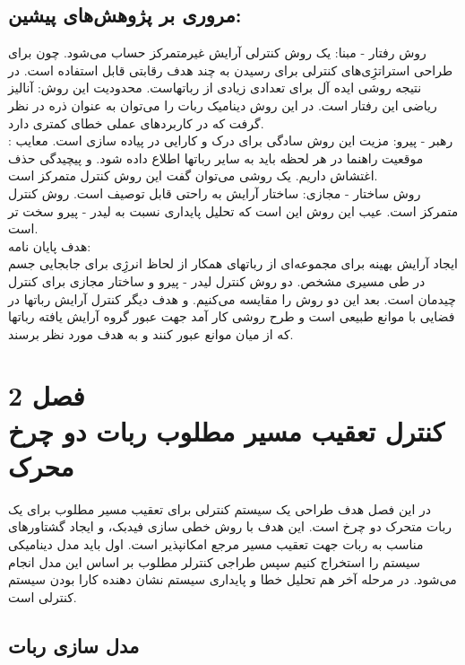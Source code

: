 \subsection{مروری بر پژوهش‌های پیشین:}
روش رفتار - مبنا:
یک روش کنترلی آرایش غیرمتمرکز حساب می‌شود. چون برای طراحی استراتژِی‌های کنترلی برای رسیدن به چند هدف رقابتی قابل استفاده است. در نتیجه روشی ایده آل برای تعدادی زیادی از رباتهاست.
محدودیت این روش: آنالیز ریاضی این رفتار است.
در این روش دینامیک ربات را می‌توان به عنوان ذره در نظر گرفت که در کاربردهای عملی خطای کمتری دارد.
\\
رهبر - پیرو:
مزیت این روش سادگی برای درک و کارایی در پیاده سازی است.
معایب : موقعیت راهنما در هر لحظه باید به سایر رباتها اطلاع داده شود. و پیچیدگی حذف اغتشاش داریم. یک روشی می‌توان گفت این روش کنترل متمرکز است.
\\
روش ساختار - مجازی:
ساختار آرایش به راحتی قابل توصیف است. روش کنترل متمرکز است. عیب این روش این است که تحلیل پایداری نسبت به لیدر - پیرو سخت تر است.
\\
هدف پایان نامه:
\\
ایجاد آرایش بهینه برای مجموعه‌ای از رباتهای همکار از لحاظ انرژِی برای جابجایی جسم در طی مسیری مشخص. دو روش کنترل لیدر - پیرو و ساختار مجازی برای کنترل چیدمان است. بعد این دو روش را مقایسه می‌کنیم. و هدف دیگر کنترل آرایش رباتها در فضایی با موانع طبیعی است و طرح روشی کار آمد جهت عبور گروه آرایش یافته رباتها که از میان موانع عبور کنند و به هدف مورد نظر برسند.


\section{فصل 2 
	\\
کنترل تعقیب مسیر مطلوب ربات دو چرخ محرک}
در این فصل هدف طراحی یک سیستم کنترلی برای تعقیب مسیر مطلوب برای یک ربات متحرک دو چرخ است.
این هدف با روش خطی سازی فیدبک، و ایجاد گشتاورهای مناسب به ربات جهت تعقیب مسیر مرجع امکانپذیر است. اول باید مدل دینامیکی سیستم را استخراج کنیم سپس طراجی کنترلر مطلوب بر اساس این مدل انجام می‌شود. در مرحله آخر هم تحلیل خطا و پایداری سیستم نشان دهنده کارا بودن سیستم کنترلی است.
\subsection{مدل سازی ربات}
